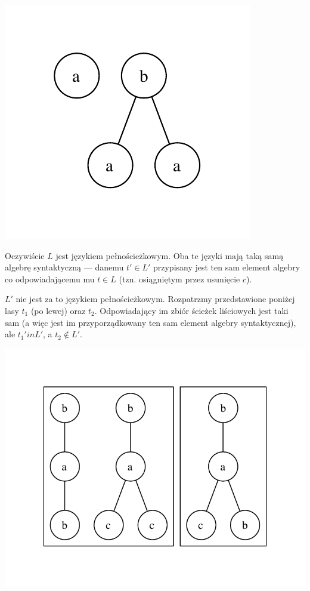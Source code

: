 \begin{przyklad}
\begin{center}
\begin{minipage}[t]{.25\linewidth}
			\includegraphics[scale=0.6]{rysunki/w12-usuniecie_c_2.pdf}
		\end{minipage}
	\end{center}
	
	Oczywiście $L$ jest językiem pełnościeżkowym. Oba te języki mają taką samą algebrę syntaktyczną --- danemu $t' \in L'$ przypisany jest ten sam element algebry co odpowiadającemu mu $t \in L$ (tzn. osiągniętym przez usunięcie $c$).
	
	$L'$ nie jest za to językiem pełnościeżkowym. Rozpatrzmy przedstawione poniżej lasy $t_1$ (po lewej) oraz $t_2$. Odpowiadający im zbiór ścieżek liściowych jest taki sam (a więc jest im przyporządkowany ten sam element algebry syntaktycznej), ale $t_1 'in L'$, a $t_2 \notin L'$.
	
	\begin{center}
		\includegraphics[scale=0.6]{rysunki/w12-l_prim.pdf}
	\end{center}
	
\end{przyklad}
